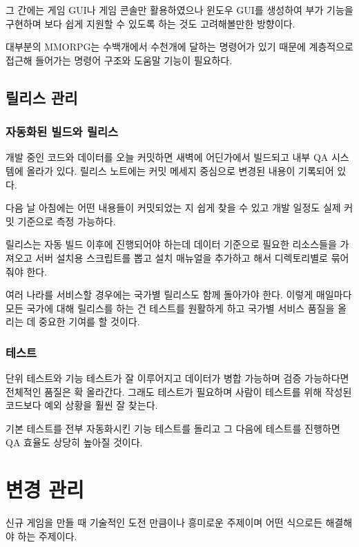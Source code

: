 \documentclass[chapter,kosection, 10.5pt, romanfixed, a4paper]{oblivoir}
\begin{document}
그 간에는 게임 GUI나 게임 콘솔만 활용하였으나 윈도우 GUI를 
생성하여 부가 기능을 구현하며 보다 쉽게 지원할 수 있도록 하는 것도 
고려해볼만한 방향이다. 

대부분의 MMORPG는 수백개에서 수천개에 달하는 명령어가 있기 때문에 
계층적으로 접근해 들어가는 명령어 구조와 도움말 기능이 필요하다. 


\section{릴리스 관리}

\subsection{자동화된 빌드와 릴리스}

개발 중인 코드와 데이터를 오늘 커밋하면 새벽에 어딘가에서 빌드되고 내부 QA 시스템에
올라가 있다. 릴리스 노트에는 커밋 메세지 중심으로 변경된 내용이 기록되어 있다. 

다음 날 아침에는 어떤 내용들이 커밋되었는 지 쉽게 찾을 수 있고 개발 일정도 실제
커밋 기준으로 측정 가능하다. 

릴리스는 자동 빌드 이후에 진행되어야 하는데 데이터 기준으로 필요한 리소스들을 가져오고 
서버 설치용 스크립트를 뽑고 설치 매뉴얼을 추가하고 해서 디렉토리별로 묶어 줘야 한다. 

여러 나라를 서비스할 경우에는 국가별 릴리스도 함께 돌아가야 한다. 
이렇게 매일마다 모든 국가에 대해 릴리스를 하는 건 테스트를 원활하게 하고 
국가별 서비스 품질을 올리는 데 중요한 기여를 할 것이다. 

\subsection{테스트}

단위 테스트와 기능 테스트가 잘 이루어지고 데이터가 병합 가능하며 검증 가능하다면 
전체적인 품질은 확 올라간다. 그래도 테스트가 필요하며 사람이 테스트를 위해 작성된 
코드보다 예외 상황을 훨씬 잘 찾는다. 

기본 테스트를 전부 자동화시킨 기능 테스트를 돌리고 그 다음에 테스트를 진행하면 
QA 효율도 상당히 높아질 것이다. 


\chapter{변경 관리}

신규 게임을 만들 때 기술적인 도전 만큼이나 흥미로운 주제이며 어떤 식으로든 해결해야 하는 주제이다. 
\end{document}
